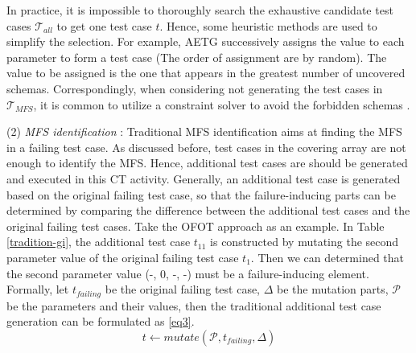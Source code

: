 \documentclass{sig-alternate}
\begin{document}
In practice, it is impossible to thoroughly search the exhaustive candidate test cases $\mathcal{T}_{all}$ to get one test case $t$. Hence, some heuristic methods are used to simplify the selection. For example, AETG \cite{cohen1997aetg} successively assigns the value to each parameter to form a test case (The order of assignment are by random). The value to be assigned is the one that appears in the greatest number of uncovered schemas. Correspondingly, when considering not generating the test cases in $\mathcal{T}_{MFS}$, it is common to utilize a constraint solver to avoid the forbidden schemas \cite{cohen2007interaction,cohen2008constructing}.



%
%






(2) \emph{MFS identification} : Traditional MFS identification aims at finding the MFS in a failing test case. As discussed before, test cases in the covering array are not enough to identify the MFS. Hence, additional test cases are should be generated and executed in this CT activity. Generally, an additional test case is generated based on the original failing test case, so that the failure-inducing parts can be determined by comparing the difference between the additional test cases and the original failing test cases. Take the OFOT approach as an example. In Table \ref{tradition-gi}, the additional test case $t_{11}$ is constructed by mutating the second parameter value of the original failing test case $t_{1}$. Then we can determined that the second parameter value (-, 0, -, -) must be a failure-inducing element.  Formally, let $t_{failing}$ be the original failing test case, $\Delta$ be the mutation parts, $\mathcal{P}$ be the parameters and their values, then the traditional additional test case generation can be formulated as \ref{eq3}.
\begin{displaymath}t \leftarrow  mutate (\mathcal{P}, t_{failing}, \Delta )  \tag{EQ3} \label{eq3} \end{displaymath}
\end{document}
